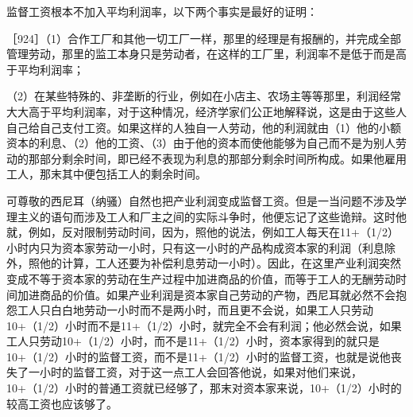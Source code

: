 监督工资根本不加入平均利润率，以下两个事实是最好的证明：

［924］（1）合作工厂和其他一切工厂一样，那里的经理是有报酬的，并完成全部管理劳动，那里的监工本身只是劳动者，在这样的工厂里，利润率不是低于而是高于平均利润率；

（2）在某些特殊的、非垄断的行业，例如在小店主、农场主等等那里，利润经常大大高于平均利润率，对于这种情况，经济学家们公正地解释说，这是由于这些人自己给自己支付工资。如果这样的人独自一人劳动，他的利润就由（1）他的小额资本的利息、（2）他的工资、（3）由于他的资本而使他能够为自己而不是为别人劳动的那部分剩余时间，即已经不表现为利息的那部分剩余时间所构成。如果他雇用工人，那末其中便包括工人的剩余时间。

可尊敬的西尼耳（纳骚）自然也把产业利润变成监督工资。但是一当问题不涉及学理主义的语句而涉及工人和厂主之间的实际斗争时，他便忘记了这些诡辩。这时他就，例如，反对限制劳动时间，因为，照他的说法，例如工人每天在11+（1/2）小时内只为资本家劳动一小时，只有这一小时的产品构成资本家的利润（利息除外，照他的计算，工人还要为补偿利息劳动一小时）。因此，在这里产业利润突然变成不等于资本家的劳动在生产过程中加进商品的价值，而等于工人的无酬劳动时间加进商品的价值。如果产业利润是资本家自己劳动的产物，西尼耳就必然不会抱怨工人只白白地劳动一小时而不是两小时，而且更不会说，如果工人只劳动10+（1/2）小时而不是11+（1/2）小时，就完全不会有利润；他必然会说，如果工人只劳动10+（1/2）小时，而不是11+（1/2）小时，资本家得到的就只是10+（1/2）小时的监督工资，而不是11+（1/2）小时的监督工资，也就是说他丧失了一小时的监督工资，对于这一点工人会回答他说，如果对他们来说，10+（1/2）小时的普通工资就已经够了，那末对资本家来说，10+（1/2）小时的较高工资也应该够了。

